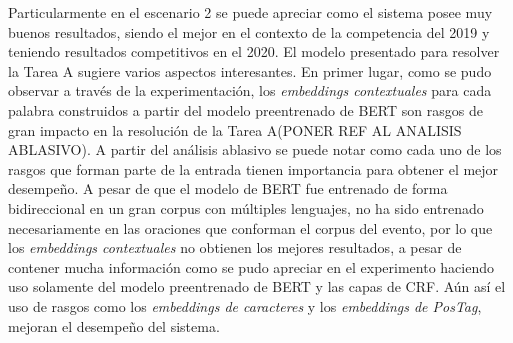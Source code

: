 Particularmente en el escenario 2 se puede apreciar como el sistema posee muy buenos resultados, siendo el mejor en el contexto de la competencia del 2019 y teniendo resultados competitivos en el 2020. El modelo presentado para resolver la Tarea A sugiere varios aspectos interesantes. En primer lugar, como se pudo observar a trav\'es de la experimentaci\'on, los \emph{embeddings contextuales} para cada palabra construidos a partir del modelo preentrenado de BERT son rasgos de gran impacto en la resoluci\'on de la Tarea A(PONER REF AL ANALISIS ABLASIVO). A partir del an\'alisis ablasivo se puede notar como cada uno de los rasgos que forman parte de la entrada tienen importancia para obtener el mejor desempe\~no. A pesar de que el modelo de BERT fue entrenado de forma bidireccional en un gran corpus con m\'ultiples lenguajes, no ha sido entrenado necesariamente en las oraciones que conforman el corpus del evento, por lo que los \emph{embeddings contextuales} no obtienen los mejores resultados, a pesar de contener mucha informaci\'on como se pudo apreciar en el experimento haciendo uso solamente del modelo preentrenado de BERT y las capas de CRF. A\'un as\'i el uso de rasgos como los \emph{embeddings de caracteres} y los \emph{embeddings de PosTag}, mejoran el desempe\~no del sistema. 


